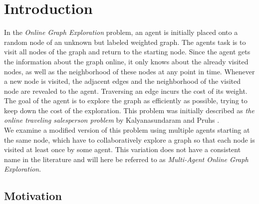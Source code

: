 \section{Introduction} \label{introduction}

In the \textit{Online Graph Exploration} problem, an agent is initially
placed onto a random node of an unknown but labeled weighted graph. The agents task is to visit
all nodes of the graph and return to the starting node.
Since the agent gets the information about the graph online, it only knows about the already visited nodes,
as well as the neighborhood of these nodes at any point in time. Whenever a new node is visited,
the adjacent edges and the neighborhood of the visited node are revealed to the agent.
Traversing an edge incurs the cost of its weight. The goal of the agent is to explore the graph
as efficiently as possible, trying to keep down the cost of the exploration.
This problem was initially described as \textit{the online traveling salesperson problem} 
by Kalyanasundaram and Pruhs \cite{Kalyanasundaram1993}.\\
We examine a modified version of this problem using multiple agents starting at the same node, which
have to collaboratively explore a graph so that each node is visited at least once by some agent.
This variation does not have a consistent name in the literature and will here be referred to as 
\textit{Multi-Agent Online Graph Exploration}.

\subsection{Motivation}

